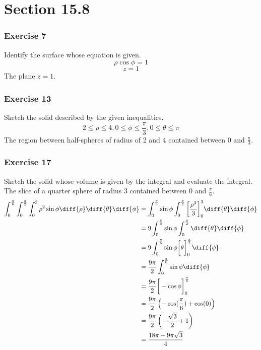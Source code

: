 \documentclass{math}
\begin{document}
\section*{Section 15.8}

\subsubsection*{Exercise 7}
Identify the surface whose equation is given.
\[ \rho\cos\phi = 1 \]
\[ z = 1 \]
The plane \( z = 1 \).

\subsubsection*{Exercise 13}
Sketch the solid described by the given inequalities.
\[ 2\le\rho\le4, 0\le\phi\le\frac{\pi}{3}, 0\le\theta\le\pi \]
The region between half-spheres of radius of 2 and 4 contained between 0 and
\( \frac{\pi}{3} \).

\subsubsection*{Exercise 17}
Sketch the solid whose volume is given by the integral and evaluate the
integral. The slice of a quarter sphere of radius 3 contained between 0 and
\( \frac{\pi}{6} \).
\begin{align*}
  \int_{0}^{\frac{\pi}{6}}\int_{0}^{\frac{\pi}{2}}\int_{0}^{3}
    \rho^2\sin\phi\diff{\rho}\diff{\theta}\diff{\phi} &=
    \int_{0}^{\frac{\pi}{6}}\sin\phi\int_{0}^{\frac{\pi}{2}}
    \bigg[\frac{\rho^3}{3}\bigg]_{0}^{3}\diff{\theta}\diff{\phi} \\
  &= 9\int_{0}^{\frac{\pi}{6}}\sin\phi\int_{0}^{\frac{\pi}{2}}
    \diff{\theta}\diff{\phi} \\
  &= 9\int_{0}^{\frac{\pi}{6}}\sin\phi\bigg[\theta\bigg]_{0}^{\frac{\pi}{2}}
    \diff{\phi} \\
  &= \frac{9\pi}{2}\int_{0}^{\frac{\pi}{6}}\sin\phi\diff{\phi} \\
  &= \frac{9\pi}{2}\bigg[-\cos\phi\bigg]_{0}^{\frac{\pi}{6}} \\
  &= \frac{9\pi}{2}\left(-\cos(\frac{\pi}{6})+\cos(0)\right) \\
  &= \frac{9\pi}{2}\left(-\frac{\sqrt{3}}{2}+1\right) \\
  &= \frac{18\pi-9\pi\sqrt{3}}{4}
\end{align*}
\end{document}
